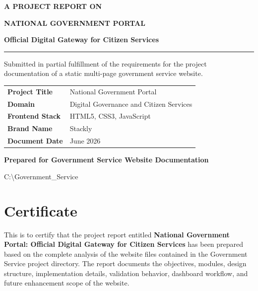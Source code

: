 \documentclass[12pt,a4paper]{report}
\begin{document}
\begin{titlepage}
    \centering
    \vspace*{0.4in}
    {\Large\bfseries\color{GovPurple}A PROJECT REPORT ON\par}
    \vspace{0.35in}
    {\Huge\bfseries\color{GovNavy}NATIONAL GOVERNMENT PORTAL\par}
    \vspace{0.2in}
    {\Large\bfseries\color{GovViolet}Official Digital Gateway for Citizen Services\par}
    \vspace{0.5in}
    \rule{0.78\textwidth}{1.2pt}
    \vspace{0.35in}

    {\large Submitted in partial fulfillment of the requirements for the project documentation of a static multi-page government service website.\par}
    \vspace{0.6in}

    \begin{tabular}{>{\bfseries}p{2.2in}p{3.2in}}
        Project Title & National Government Portal \\
        Domain & Digital Governance and Citizen Services \\
        Frontend Stack & HTML5, CSS3, JavaScript \\
        Brand Name & Stackly \\
        Document Date & June 2026 \\
    \end{tabular}

    \vfill
    {\large\bfseries\color{GovGold}Prepared for Government Service Website Documentation\par}
    \vspace{0.2in}
    {\large C:\textbackslash Government\_Service\par}
\end{titlepage}


\chapter*{Certificate}
This is to certify that the project report entitled \textbf{National Government Portal: Official Digital Gateway for Citizen Services} has been prepared based on the complete analysis of the website files contained in the Government Service project directory. The report documents the objectives, modules, design structure, implementation details, validation behavior, dashboard workflow, and future enhancement scope of the website.
\end{document}
